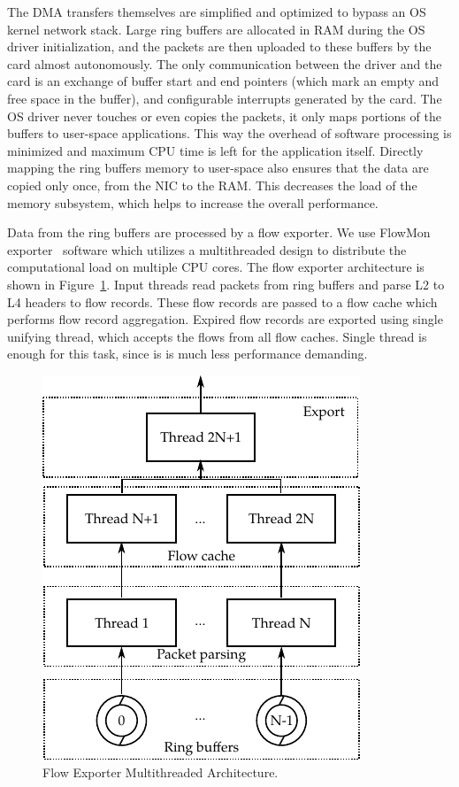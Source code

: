 The DMA transfers themselves are simplified and optimized to bypass an OS kernel network stack. Large ring buffers are allocated in RAM during the OS driver initialization, and the packets are then uploaded to these buffers by the card almost autonomously. The only communication between the driver and the card is an exchange of buffer start and end pointers (which mark an empty and free space in the buffer), and configurable interrupts generated by the card. The OS driver never touches or even copies the packets, it only maps portions of the buffers to user-space applications. This way the overhead of software processing is minimized and maximum CPU time is left for the application itself. Directly mapping the ring buffers memory to user-space also ensures that the data are copied only once, from the NIC to the RAM. This decreases the load of the memory subsystem, which helps to increase the overall performance.

Data from the ring buffers are processed by a flow exporter. We use FlowMon exporter~\cite{FlowmonNetworks--Flowmon} software which utilizes a multithreaded design to distribute the computational load on multiple CPU cores. The flow exporter architecture is shown in Figure~\ref{fig:exporter}. Input threads read packets from ring buffers and parse L2 to L4 headers to flow records. These flow records are passed to a flow cache which performs flow record aggregation. Expired flow records are exported using single unifying thread, which accepts the flows from all flow caches. Single thread is enough for this task, since is is much less performance demanding.

\begin{figure}[t]
    \centering 
    \includegraphics{figures/paper-highdensity/fig/exporter}
    \caption{Flow Exporter Multithreaded Architecture.}
    \label{fig:exporter}
\end{figure}

